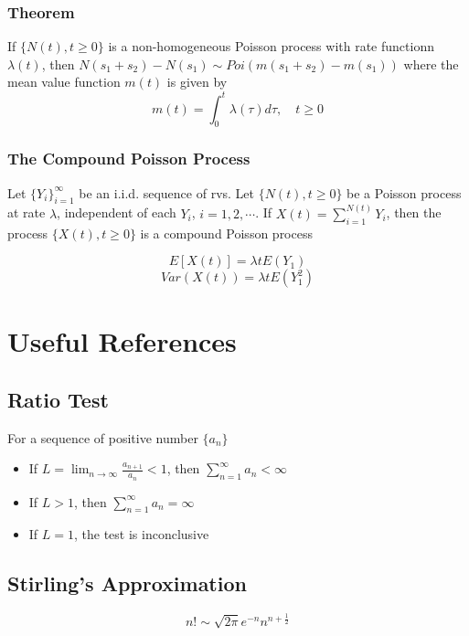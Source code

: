 \documentclass[11pt]{article}
\newcommand{\ds}{\displaystyle}
\begin{document}
\subsubsection*{Theorem}
If $\{N(t),t\geq0\}$ is a non-homogeneous Poisson process with rate functionn $\lambda(t)$, then 
$N(s_1+s_2)-N(s_1)\sim Poi(m(s_1+s_2)-m(s_1))$ where the mean value function $m(t)$ is given by 
\[m(t) = \int_{0}^{t}\lambda(\tau)d\tau,\quad t\geq0\]
\subsubsection{The Compound Poisson Process}
Let $\{Y_i\}_{i=1}^{\infty}$ be an i.i.d. sequence of rvs. Let $\{N(t),t\geq0\}$ be a Poisson process 
at rate $\lambda$, independent of each $Y_i$, $i=1,2,\cdots$. If $X(t)=\sum_{i=1}^{N(t)}Y_i$, then the 
process $\{X(t),t\geq0\}$ is a compound Poisson process 

\[E[X(t)] = \lambda tE(Y_1)\]
\[Var(X(t)) = \lambda tE(Y_1^2)\]

\newpage 
\section{Useful References}
\subsection{Ratio Test}
For a sequence of positive number $\{a_n\}$
\begin{itemize}
    \item If $L = \ds\lim_{n\to\infty}\frac{a_{n+1}}{a_n} < 1$, then $\sum_{n=1}^{\infty}a_n < \infty$ 
    \item If $L > 1$, then $\sum_{n=1}^{\infty}a_n = \infty$
    \item If $L = 1$, the test is inconclusive
\end{itemize}
\subsection{Stirling's Approximation}
\[n! \sim \sqrt{2\pi}e^{-n} n^{n+\frac{1}{2}}\]
\end{document}
